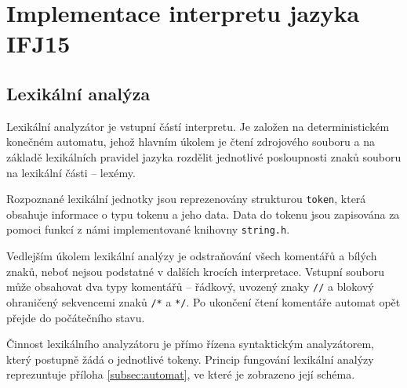 \documentclass[a4paper, 12pt]{article}
\begin{document}
\newpage

\section{Implementace interpretu jazyka IFJ15} \label{implementace}
\subsection{Lexikální analýza} \label{lexer}

Lexikální analyzátor je vstupní částí interpretu. Je založen na deterministickém
konečném automatu, jehož hlavním úkolem je čtení zdrojového souboru a na základě
lexikálních pravidel jazyka rozdělit jednotlivé posloupnosti znaků
souboru na lexikální části -- lexémy.

Rozpoznané lexikální jednotky jsou reprezenovány strukturou \texttt{token},
která obsahuje informace o typu tokenu a jeho data. Data do tokenu jsou
zapisována za pomoci funkcí z námi implementované knihovny \texttt{string.h}.


Vedlejším úkolem lexikální analýzy je odstraňování všech komentářů a bílých
znaků, neboť nejsou podstatné v dalších krocích interpretace. Vstupní souboru
může obsahovat dva typy komentářů -- řádkový, uvozený znaky
\texttt{//} a blokový ohraničený sekvencemi znaků
\texttt{/*} a \texttt{*/}. Po ukončení čtení komentáře automat opět přejde
do počátečního stavu.

Činnost lexikálního analyzátoru je přímo řízena syntaktickým analyzátorem, který
postupně žádá o jednotlivé tokeny. Princip fungování lexikální analýzy
reprezuntuje příloha \ref{subsec:automat}, ve které je zobrazeno její schéma.
\end{document}
